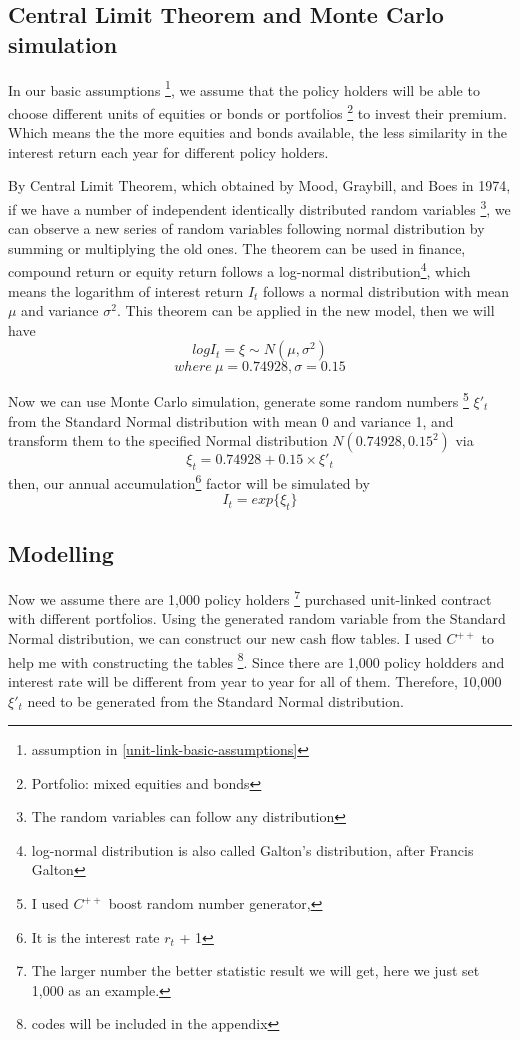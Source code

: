\documentclass{report}
\begin{document}
\subsection{Central Limit Theorem and Monte Carlo simulation}

In our basic assumptions \footnote{assumption in \ref{unit-link-basic-assumptions}}, we assume that the policy holders will be able to choose different units of equities or bonds or portfolios \footnote{Portfolio: mixed equities and bonds} to invest their premium. Which means the the more equities and bonds available, the less similarity in the interest return each year for different policy holders. 

By \cite{bib:CLT}Central Limit Theorem, which obtained by Mood, Graybill, and Boes in 1974, if we have a number of independent identically distributed random variables \footnote{The random variables can follow any distribution}, we can observe a new series of random variables following normal distribution by summing or multiplying the old ones. The theorem can be used in finance, compound return or equity return follows a log-normal distribution\footnote{log-normal distribution is also called Galton's distribution, after Francis Galton}, which means the logarithm of interest return $I_t$ follows a normal distribution with mean $\mu$ and variance $\sigma^2$. This theorem can be applied in the new model, then we will have
\[
logI_t = \xi \sim N(\mu,\sigma^2)
\]
\[
where\   \mu= 0.74928, \sigma= 0.15 
\]

Now we can use Monte Carlo simulation\cite{bib:MCS}, generate some random numbers \footnote{I used $C^{++}$ boost random number generator, } $\xi'_t$ from the Standard Normal distribution with mean 0 and variance 1, and transform them to the specified Normal distribution $N(0.74928,0.15^2)$ via   
\[
\xi_t = 0.74928 + 0.15\times \xi'_t
\]
then, our annual accumulation\footnote{It is the interest rate $r_t$ + 1} factor will be simulated by 
\[
I_t=exp\{\xi_t\} 
\]



\subsection{Modelling}

Now we assume there are 1,000 policy holders \footnote{The larger number the better statistic result we will get, here we just set 1,000 as an example.} purchased unit-linked contract with different portfolios. Using the generated random variable from the Standard Normal distribution, we can construct our new cash flow tables. I used $C^{++}$ to help me with constructing the tables \footnote{codes will be included in the appendix}. Since there are 1,000 policy holdders and interest rate will be different from year to year for all of them. Therefore, 10,000  $\xi'_t$ need to be generated from the Standard Normal distribution.
\end{document}
